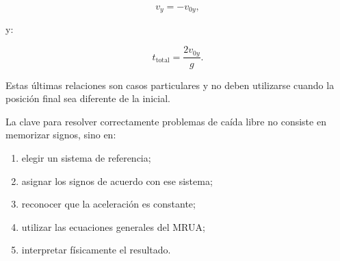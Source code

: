\begin{resumen}
\[ \boxed{v_y=-v_{0y}}, \]

y:

\[ \boxed{t_{\text{total}}=\frac{2v_{0y}}{g}}. \]

Estas últimas relaciones son casos particulares y no deben utilizarse cuando la posición final sea diferente de la inicial.

La clave para resolver correctamente problemas de caída libre no consiste en memorizar signos, sino en:

\begin{enumerate}
    \item elegir un sistema de referencia;
    \item asignar los signos de acuerdo con ese sistema;
    \item reconocer que la aceleración es constante;
    \item utilizar las ecuaciones generales del MRUA;
    \item interpretar físicamente el resultado.
\end{enumerate}
\end{resumen}